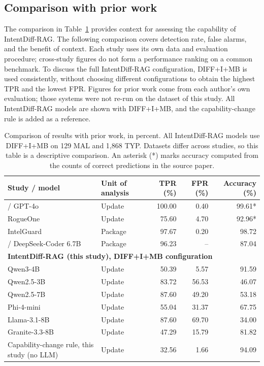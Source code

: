 \documentclass[a4paper,fleqn]{cas-dc}
\begin{document}
\subsection{Comparison with prior work}\label{sec:prior}
The comparison in Table~\ref{tab:cross-study} provides context for assessing the
capability of IntentDiff-RAG. The following comparison covers detection rate,
false alarms, and the benefit of context. Each study uses its own data and
evaluation procedure; cross-study figures do not form a performance ranking on a
common benchmark. To discuss the full IntentDiff-RAG configuration, DIFF+I+MB is
used consistently, without choosing different configurations to obtain the
highest TPR and the lowest FPR. Figures for prior work come from each author's own evaluation; those systems
were not re-run on the dataset of this study. All IntentDiff-RAG models are shown
with DIFF+I+MB, and the capability-change rule is added as a reference.

\begin{table}[t]
\centering\small
\caption{Comparison of results with prior work, in percent.
All IntentDiff-RAG models use DIFF+I+MB on 129 MAL and 1,868 TYP.
Datasets differ across studies, so this table is a descriptive comparison.
An asterisk (*) marks accuracy computed from the counts of correct predictions
in the source paper.}
\label{tab:cross-study}
\begin{tabular}{p{6.5cm} l r r r}
\toprule
Study / model & Unit of analysis & TPR (\%) & FPR (\%) & Accuracy (\%) \\
\midrule
\citet{wyss2025evaluating} / GPT-4o & Update & 100.00 & 0.40 & 99.61* \\
RogueOne \citep{sofaer2024rogueone} & Update & 75.60 & 4.70 & 92.96* \\
IntelGuard \citep{guo2026bridging} & Package & 97.67 & 0.20 & 98.72 \\
\citet{nguyen2025taint} / DeepSeek-Coder 6.7B & Package & 96.23 & -- & 87.04 \\
\midrule
\multicolumn{5}{l}{\textbf{IntentDiff-RAG (this study), DIFF+I+MB configuration}} \\
Qwen3-4B & Update & 50.39 & 5.57 & 91.59 \\
Qwen2.5-3B & Update & 83.72 & 56.53 & 46.07 \\
Qwen2.5-7B & Update & 87.60 & 49.20 & 53.18 \\
Phi-4-mini & Update & 55.04 & 31.37 & 67.75 \\
Llama-3.1-8B & Update & 87.60 & 69.70 & 34.00 \\
Granite-3.3-8B & Update & 47.29 & 15.79 & 81.82 \\
\midrule
Capability-change rule, this study (no LLM) & Update & 32.56 & 1.66 & 94.09 \\
\bottomrule
\end{tabular}
\end{table}
\end{document}
